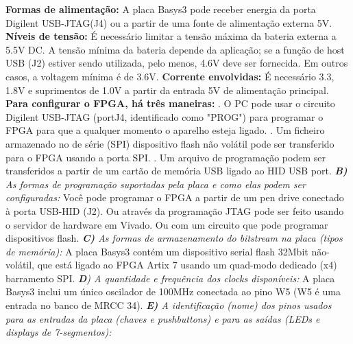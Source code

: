 \documentclass[12pts]{article}
\begin{document}
\textbf{ Formas de alimentação:} A placa Basys3 pode receber energia da porta Digilent USB-JTAG(J4) ou a partir de uma fonte de alimentação externa 5V.
\singlespacing
\textbf{Níveis de tensão:} É necessário limitar a tensão máxima da bateria externa a 5.5V DC. A tensão mínima da bateria depende da aplicação; se a função de host USB (J2) estiver sendo utilizada, pelo menos,
4.6V deve ser fornecida. Em outros casos, a voltagem mínima é de 3.6V.
\singlespacing
\textbf{Corrente envolvidas:} É necessário 3.3, 1.8V e suprimentos de 1.0V a partir da entrada 5V de alimentação principal.
\singlespacing
\textbf{Para configurar o FPGA, há três maneiras:}
. O PC pode usar o circuito Digilent USB-JTAG (portJ4, identificado como "PROG") para programar o FPGA para que a qualquer momento o aparelho esteja ligado.
. Um ficheiro armazenado no de série (SPI) dispositivo flash não volátil pode ser transferido para o FPGA usando a porta SPI.
. Um arquivo de programação podem ser transferidos a partir de um cartão de memória USB ligado ao HID USB port.
\singlespacing
\textit{\textbf{B)} As formas de programação suportadas pela placa e como elas podem ser configuradas:}
        Você pode programar o FPGA a partir de um pen drive conectado à porta USB-HID (J2). Ou através da programação JTAG pode ser feito usando o servidor de hardware em Vivado. Ou com um circuito que pode programar dispositivos flash.
\singlespacing
\textit{\textbf{C)} As formas de armazenamento do bitstream na placa (tipos de memória):}
        A placa Basys3 contém um dispositivo serial flash 32Mbit não-volátil, que está ligado ao FPGA Artix 7 usando um quad-modo dedicado (x4) barramento SPI.
\singlespacing
\textit{\textbf{D}) A quantidade e frequência dos clocks disponíveis:}
A placa Basys3 inclui um único oscilador de 100MHz conectada ao pino W5 (W5 é uma entrada no banco de MRCC 34).
\singlespacing
\textit{\textbf{E)} A identificação (nome) dos pinos usados para as entradas da placa (chaves e pushbuttons) e para as saídas (LEDs e displays de 7-segmentos):}
\end{document}
